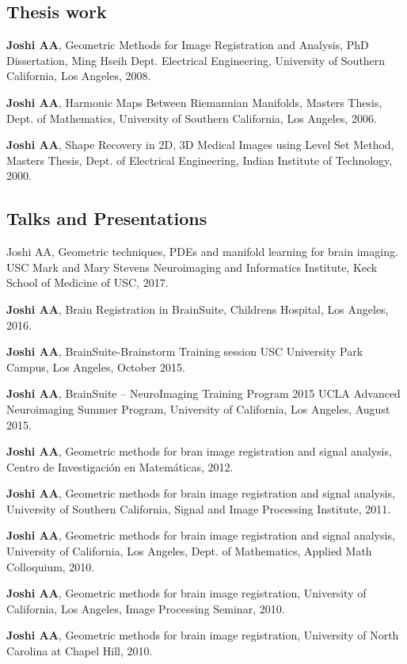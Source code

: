 \documentclass[overlapped,line,letterpaper]{res}
\begin{document}
\begin{resume}
\subsection{Thesis work}
\textbf{Joshi AA}, Geometric Methods for Image Registration and Analysis, PhD Dissertation, Ming Hseih Dept. Electrical Engineering, University of Southern California, Los Angeles, 2008.

\textbf{Joshi AA}, Harmonic Maps Between Riemannian Manifolds, Masters Thesis, Dept. of Mathematics, University of Southern California, Los Angeles, 2006.

\textbf{Joshi AA}, Shape Recovery in 2D, 3D Medical Images using Level Set Method, Masters Thesis, Dept. of Electrical Engineering, Indian Institute of Technology, 2000.

\subsection{Talks and Presentations}

Joshi AA, Geometric techniques, PDEs and manifold learning for brain imaging. USC Mark and Mary Stevens
Neuroimaging and Informatics Institute, 
Keck School of Medicine of USC, 2017.

\textbf{Joshi AA}, Brain Registration in BrainSuite, Childrens Hospital, Los Angeles, 2016.

\textbf{Joshi AA}, BrainSuite-Brainstorm Training session USC University Park Campus, Los Angeles, October 2015.

\textbf{Joshi AA}, BrainSuite – NeuroImaging Training Program 2015 UCLA Advanced Neuroimaging Summer Program, University of California, Los Angeles, August 2015.  

\textbf{Joshi AA}, Geometric methods for bran image registration and signal analysis, Centro de Investigación en Matemáticas, 2012.

\textbf{Joshi AA}, Geometric methods for brain image registration and signal analysis, University of Southern California, Signal and Image Processing Institute, 2011.

\textbf{Joshi AA}, Geometric methods for brain image registration and signal analysis, University of California, Los Angeles, Dept. of Mathematics, Applied Math Colloquium, 2010.

\textbf{Joshi AA}, Geometric methods for brain image registration, University of California, Los Angeles, Image Processing Seminar, 2010. 

\textbf{Joshi AA}, Geometric methods for brain image registration, University of North Carolina at Chapel Hill, 2010. 


\end{resume}
\end{document}
